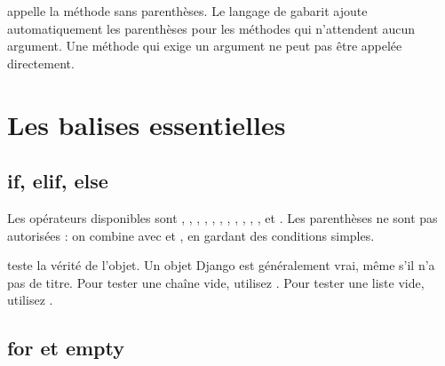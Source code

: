 \begin{note}
 appelle la méthode  sans
parenthèses. Le langage de gabarit ajoute automatiquement les parenthèses pour les
méthodes qui n'attendent aucun argument. Une méthode qui exige un argument ne peut
pas être appelée directement.
\end{note}

\section{Les balises essentielles}

\subsection{if, elif, else}


Les opérateurs disponibles sont \code{==}, \code{!=}, \code{<}, \code{>},
\code{<=}, \code{>=}, , , , ,
,  et . Les parenthèses ne sont pas autorisées : on
combine avec  et , en gardant des conditions simples.

\begin{attention}
 teste la vérité de l'objet. Un objet Django est
généralement vrai, même s'il n'a pas de titre. Pour tester une chaîne vide,
utilisez . Pour tester une liste vide, utilisez
.
\end{attention}

\subsection{for et empty}


